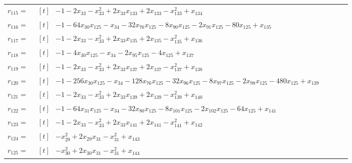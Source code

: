 \begin{longtable}{@{}r p{0.92\linewidth}@{}}
$r_{115}=$ & $\begin{aligned}[t]&-1-2x_{33}-x_{33}^{2}+2x_{33}x_{133}+2x_{133}-x_{133}^{2}+x_{134}\end{aligned}$ \\[2pt]
$r_{116}=$ & $\begin{aligned}[t]&-1-64x_{30}x_{125}-x_{34}-32x_{76}x_{125}-8x_{90}x_{125}-2x_{91}x_{125}-80x_{125}+x_{135}\end{aligned}$ \\[2pt]
$r_{117}=$ & $\begin{aligned}[t]&-1-2x_{33}-x_{33}^{2}+2x_{33}x_{135}+2x_{135}-x_{135}^{2}+x_{136}\end{aligned}$ \\[2pt]
$r_{118}=$ & $\begin{aligned}[t]&-1-4x_{30}x_{125}-x_{34}-2x_{95}x_{125}-4x_{125}+x_{137}\end{aligned}$ \\[2pt]
$r_{119}=$ & $\begin{aligned}[t]&-1-2x_{33}-x_{33}^{2}+2x_{33}x_{137}+2x_{137}-x_{137}^{2}+x_{138}\end{aligned}$ \\[2pt]
$r_{120}=$ & $\begin{aligned}[t]&-1-256x_{30}x_{125}-x_{34}-128x_{76}x_{125}-32x_{96}x_{125}-8x_{97}x_{125}-2x_{98}x_{125}-480x_{125}+x_{139}\end{aligned}$ \\[2pt]
$r_{121}=$ & $\begin{aligned}[t]&-1-2x_{33}-x_{33}^{2}+2x_{33}x_{139}+2x_{139}-x_{139}^{2}+x_{140}\end{aligned}$ \\[2pt]
$r_{122}=$ & $\begin{aligned}[t]&-1-64x_{31}x_{125}-x_{34}-32x_{80}x_{125}-8x_{101}x_{125}-2x_{102}x_{125}-64x_{125}+x_{141}\end{aligned}$ \\[2pt]
$r_{123}=$ & $\begin{aligned}[t]&-1-2x_{33}-x_{33}^{2}+2x_{33}x_{141}+2x_{141}-x_{141}^{2}+x_{142}\end{aligned}$ \\[2pt]
$r_{124}=$ & $\begin{aligned}[t]&-x_{29}^{2}+2x_{29}x_{31}-x_{31}^{2}+x_{143}\end{aligned}$ \\[2pt]
$r_{125}=$ & $\begin{aligned}[t]&-x_{30}^{2}+2x_{30}x_{31}-x_{31}^{2}+x_{144}\end{aligned}$ \\[2pt]

\end{longtable}
